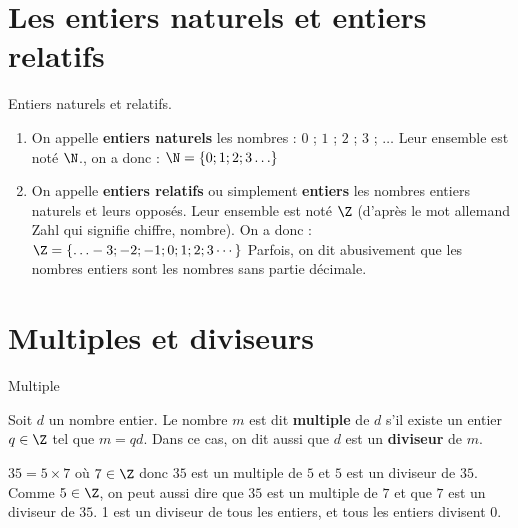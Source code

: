 \begin{pageCours}


\section{Les entiers naturels et entiers relatifs}

\begin{DefT}{Entiers naturels et relatifs.}

\begin{enumerate}
\item On appelle \textbf{entiers naturels} les nombres : $0$ ; $1$ ; $2$ ; $3$ ; $\ldots$  Leur ensemble est noté $\N$., on a donc : $\N =  \lbrace 0 ; 1 ; 2 ; 3 \ldots \rbrace $
 
\item  On appelle \textbf{entiers relatifs} ou simplement \textbf{entiers} les nombres entiers naturels et leurs opposés. Leur ensemble est noté $\Z$ (d'après le mot allemand Zahl qui signifie chiffre, nombre).
On a donc : $\Z = \lbrace \ldots -3 ; -2 ; -1 ; 0 ; 1 ; 2 ; 3  \cdots  \rbrace$
Parfois, on dit abusivement que les nombres entiers sont les nombres sans partie décimale.
\end{enumerate}
\end{DefT}

 
\section{Multiples et diviseurs}

\begin{minipage}{0.5\linewidth}

\begin{DefT}{Multiple}

  Soit $d$ un nombre entier. Le nombre $m$ est dit \textbf{multiple} de $d$ s'il existe un entier $q \in \Z$ tel que $m=qd$. Dans ce cas, on dit aussi
  que $d$ est un \textbf{diviseur} de $m$.
\end{DefT}
\end{minipage}
\begin{minipage}{0.5\linewidth}
\begin{Exs} 
  $35=5 \times 7$ où $7 \in \Z$ donc $35$ est un multiple de $5$
  et $5$ est un diviseur de $35$. Comme $5 \in \Z$, on peut aussi
  dire que $35$ est un multiple de $7$ et que $7$ est un diviseur de
  $35$.
  1 est un diviseur de tous les entiers, et tous les entiers
  divisent 0.
\end{Exs}
\end{minipage}



\end{pageCours}
